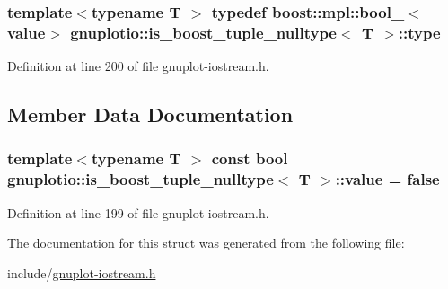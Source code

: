 \subsubsection[{\texorpdfstring{type}{type}}]{\setlength{\rightskip}{0pt plus 5cm}template$<$typename T $>$ typedef boost\+::mpl\+::bool\+\_\+$<${\bf value}$>$ {\bf gnuplotio\+::is\+\_\+boost\+\_\+tuple\+\_\+nulltype}$<$ T $>$\+::{\bf type}}\hypertarget{structgnuplotio_1_1is__boost__tuple__nulltype_a6b9e2eaadcaa5c788131d4e9e4186349}{}\label{structgnuplotio_1_1is__boost__tuple__nulltype_a6b9e2eaadcaa5c788131d4e9e4186349}


Definition at line 200 of file gnuplot-\/iostream.\+h.



\subsection{Member Data Documentation}
\subsubsection[{\texorpdfstring{value}{value}}]{\setlength{\rightskip}{0pt plus 5cm}template$<$typename T $>$ const bool {\bf gnuplotio\+::is\+\_\+boost\+\_\+tuple\+\_\+nulltype}$<$ T $>$\+::value = false\hspace{0.3cm}{\ttfamily [static]}}\hypertarget{structgnuplotio_1_1is__boost__tuple__nulltype_aed42a98e58eb94c7ba55ea7d2a8f7fd2}{}\label{structgnuplotio_1_1is__boost__tuple__nulltype_aed42a98e58eb94c7ba55ea7d2a8f7fd2}


Definition at line 199 of file gnuplot-\/iostream.\+h.



The documentation for this struct was generated from the following file\+:\begin{DoxyCompactItemize}
\item 
include/\hyperlink{gnuplot-iostream_8h}{gnuplot-\/iostream.\+h}\end{DoxyCompactItemize}
